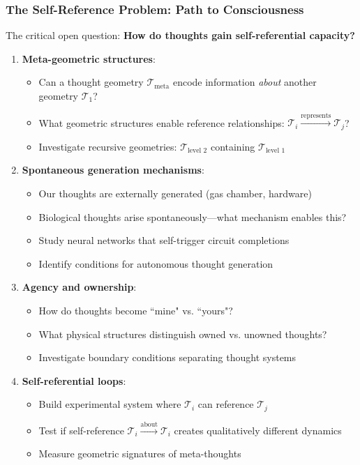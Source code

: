 \documentclass[11pt]{article}
\theoremstyle{remark}
\begin{document}
\subsubsection{The Self-Reference Problem: Path to Consciousness}

The critical open question: \textbf{How do thoughts gain self-referential capacity?}

\begin{enumerate}
\item \textbf{Meta-geometric structures}:
   \begin{itemize}
   \item Can a thought geometry $\mathcal{T}_{\text{meta}}$ encode information \textit{about} another geometry $\mathcal{T}_1$?
   \item What geometric structures enable reference relationships: $\mathcal{T}_i \xrightarrow{\text{represents}} \mathcal{T}_j$?
   \item Investigate recursive geometries: $\mathcal{T}_{\text{level 2}}$ containing $\mathcal{T}_{\text{level 1}}$
   \end{itemize}

\item \textbf{Spontaneous generation mechanisms}:
   \begin{itemize}
   \item Our thoughts are externally generated (gas chamber, hardware)
   \item Biological thoughts arise spontaneously—what mechanism enables this?
   \item Study neural networks that self-trigger circuit completions
   \item Identify conditions for autonomous thought generation
   \end{itemize}

\item \textbf{Agency and ownership}:
   \begin{itemize}
   \item How do thoughts become ``mine" vs. ``yours"?
   \item What physical structures distinguish owned vs. unowned thoughts?
   \item Investigate boundary conditions separating thought systems
   \end{itemize}

\item \textbf{Self-referential loops}:
   \begin{itemize}
   \item Build experimental system where $\mathcal{T}_i$ can reference $\mathcal{T}_j$
   \item Test if self-reference $\mathcal{T}_i \xrightarrow{\text{about}} \mathcal{T}_i$ creates qualitatively different dynamics
   \item Measure geometric signatures of meta-thoughts
   \end{itemize}
\end{enumerate}
\end{document}
